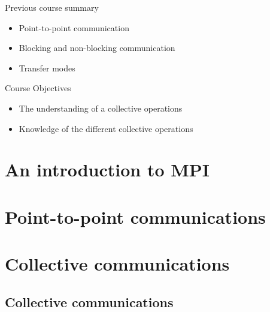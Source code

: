 \documentclass[aspectratio=43]{beamer}
\begin{document}
\cscstitle

\begin{frame}{Previous course summary}
\begin{itemize}
\item Point-to-point communication
\item Blocking and non-blocking communication
\item Transfer modes
\end{itemize}
\end{frame}

\begin{frame}{Course Objectives}
\begin{itemize}
\item The understanding of a collective operations
\item Knowledge of the different collective operations
\end{itemize}
\end{frame}


\section{An introduction to MPI}
\section{Point-to-point communications}
\section{Collective communications}


\subsection{Collective communications}
\end{document}
